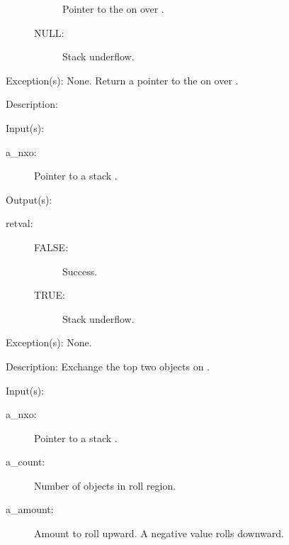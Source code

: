\begin{capi}
\begin{capilist}
\begin{description}
\begin{description}
				Pointer to the  on  over
				.
			\item[NULL: ]
				Stack underflow.
			\end{description}
		\end{description}
	\item[Exception(s): ] None.
		Return a pointer to the  on  over
		.
	\item[Description: ]
	\end{capilist}
\label{nxo_stack_exch}
	\begin{capilist}
	\item[Input(s): ]
		\begin{description}\item[]
		\item[a\_nxo: ]
			Pointer to a stack .
		\end{description}
	\item[Output(s): ]
		\begin{description}\item[]
		\item[retval: ]
			\begin{description}\item[]
			\item[FALSE: ]
				Success.
			\item[TRUE: ]
				Stack underflow.
			\end{description}
		\end{description}
	\item[Exception(s): ] None.
	\item[Description: ]
		Exchange the top two objects on .
	\end{capilist}
\label{nxo_stack_rool}
	\begin{capilist}
	\item[Input(s): ]
		\begin{description}\item[]
		\item[a\_nxo: ]
			Pointer to a stack \classname{nxo}.
		\item[a\_count: ]
			Number of objects in roll region.
		\item[a\_amount: ]
			Amount to roll upward.  A negative value rolls downward.

\end{description}
\end{capilist}
\end{capi}

